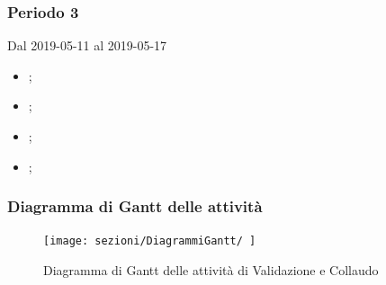 \subsubsection{Periodo 3} 
Dal 2019-05-11 al 2019-05-17
\begin{itemize}
	\item \textbf{};
	\item \textbf{};
	\item \textbf{};
	\item \textbf{};
\end{itemize}
\subsubsection{Diagramma di Gantt delle attività}
\begin{figure}[h]
	\texttt{[image: sezioni/DiagrammiGantt/ ]}
	\caption{Diagramma di Gantt delle attività di Validazione e Collaudo}
\end{figure}

